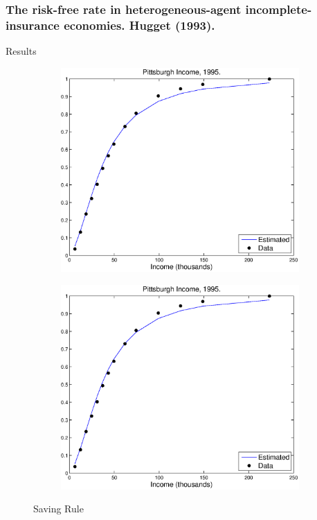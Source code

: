 \documentclass{beamer}
\begin{document}
\frame
{
  \frametitle{ The risk-free rate in heterogeneous-agent incomplete-insurance economies. Hugget (1993).}
Results 
\begin{figure}
        \begin{subfigure}[b]{0.5\textwidth}
                \includegraphics[width=\textwidth]{GLN4Fy.eps}
        \end{subfigure}%
        \begin{subfigure}[b]{0.5\textwidth}
                \includegraphics[width=\textwidth]{GLN4Fy.eps}
        \end{subfigure}
        \caption{Saving Rule}
\end{figure}
}
\end{document}
